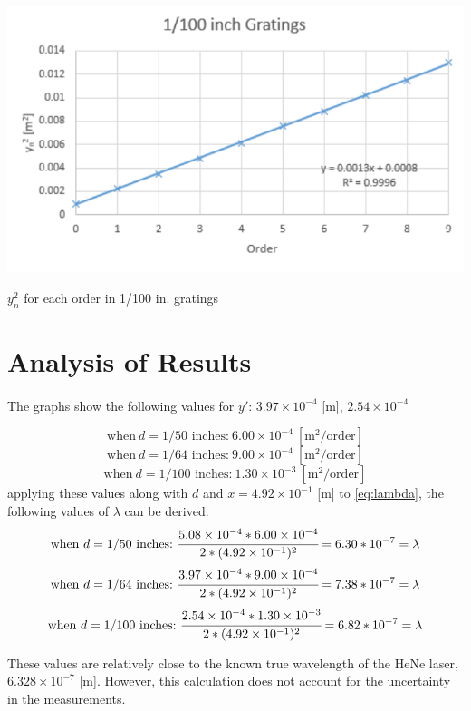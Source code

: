 \documentclass{article}
\begin{document}
\begin{graph}
  \includegraphics[width=\textwidth]{img/100.pdf}
  \caption{$y_{n}^{2}$ for each order in 1/100 in. gratings}
  \label{g:100}
\end{graph}

\section{Analysis of Results}
\paragraph{}

The graphs show the following values for $y'$:
$3.97 \times 10^{-4}$ [m], $2.54 \times 10^{-4}$

$$
\text{when}~d=\text{1/50 inches:}~6.00 \times 10^{-4}~[\text{m}^2/\text{order}]
$$
$$
\text{when}~d=\text{1/64 inches:}~9.00 \times 10^{-4}~[\text{m}^2/\text{order}]
$$
$$
\text{when}~d=\text{1/100 inches:}~1.30 \times 10^{-3}~[\text{m}^2/\text{order}]
$$
applying these values along with $d$ and $x = 4.92 \times 10^{-1}$ [m] to \eqref{eq:lambda}, the following values of $\lambda$ can be derived.
$$
\text{when}~d=\text{1/50 inches:}~\cfrac{5.08 \times 10^{-4} * 6.00 \times 10^{-4}}{2*(4.92 \times 10^{-1})^2} = 6.30 * 10^{-7} = \lambda
$$
$$
\text{when}~d=\text{1/64 inches:}~\cfrac{3.97 \times 10^{-4} * 9.00 \times 10^{-4}}{2*(4.92 \times 10^{-1})^2} = 7.38 * 10^{-7} = \lambda
$$
$$
\text{when}~d=\text{1/100 inches:}~\cfrac{2.54 \times 10^{-4} * 1.30 \times 10^{-3}}{2*(4.92 \times 10^{-1})^2} = 6.82 * 10^{-7} = \lambda
$$

These values are relatively close to the known true wavelength of the HeNe laser, $6.328 \times 10^{-7}$ [m]. However, this calculation does not account for the uncertainty in the measurements.
\end{document}

